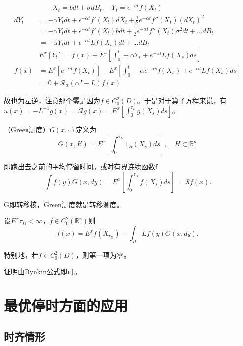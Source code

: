 \[
  \begin{aligned}
    & \qquad X_t = b dt + \sigma d B_t, \quad Y_t = e^{-\alpha t} f(X_t)\\
    dY_t &= -\alpha Y_t dt + e^{-\alpha t} f'(X_t) dX_t + \frac{1}{2} e^{-\alpha t} f''(X_t) (dX_t)^2\\
    &= -\alpha Y_t dt + e^{-\alpha t} f'(X_t) b dt + \frac{1}{2} e^{-\alpha t} f''(X_t) \sigma^2 dt + \dots dB_t\\
    &= -\alpha Y_t dt + e^{-\alpha t} Lf(X_t) dt + \dots dB_t\\
    &E^x[Y_t] = f(x) + E^x\left[ \int_0^t -\alpha Y_s + e^{-\alpha t} Lf(X_s) ds \right]\\
    f(x) &= E^x\left[ e^{-\alpha t} f(X_t) \right] - E^x\left[ \int_0^t -\alpha e^{-\alpha s} f(X_s) + e^{-\alpha t} Lf(X_s) ds \right]\\
    &= 0 + \mathcal{R}_\alpha (\alpha I - L) f(x)
  \end{aligned}
\]

故也为左逆，注意那个零是因为$f \in C_0^2(D)$。于是对于算子方程来说，有$u(x) = -L^{-1} g(x) = \mathcal{R} g(x) = E^x\left[\int_0^{\tau_D} g(X_s) ds\right]$。

\begin{df}（Green测度）$G(x, \cdot)$定义为
  \[
    G(x, H)=E^{x} \left[ \int_{0}^{\tau_{D}} 1_{H}\left(X_{s}\right) d s \right], \quad H \subset \mathbb{R}^{n}
  \]
  
  即跑出去之前的平均停留时间。或对有界连续函数f 
  \[
    \int f(y) G(x, d y)=E^{x} \left[ \int_{0}^{\tau_{D}} f\left(X_{s}\right) d s \right] = \mathcal{R} f(x).
  \]
\end{df}

G即转移核，Green测度就是转移测度。

\begin{coro}
  设$E^{x} \tau_{D}<\infty$，$f \in C_{0}^{2}\left(\mathbb{R}^{n}\right)$则
  \[
    f(x)=E^{x} f\left(X_{\tau_{D}}\right)-\int_{D} L f(y) G(x, d y).
  \]

  特别地，若$f \in C_{0}^{2}(D)$，则第一项为零。
\end{coro}

证明由Dynkin公式即可。

\section{最优停时方面的应用}

\subsection{时齐情形}

